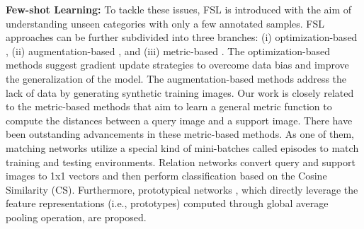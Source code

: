 \documentclass[10pt,twocolumn,letterpaper]{article}
\begin{document}
\textbf{Few-shot Learning:}
To tackle these issues, FSL is introduced with the aim of understanding unseen categories with only a few annotated samples. FSL approaches can be further subdivided into three branches: (i) optimization-based \cite{FSL2,optimization1,optimization2}, (ii) augmentation-based \cite{augmen1,augmen2}, and (iii) metric-based \cite{FSS17prototypical,metric1,metric-relation}. The optimization-based methods suggest gradient update strategies to overcome data bias and improve the generalization of the model. The augmentation-based methods address the lack of data by generating synthetic training images. Our work is closely related to the metric-based methods that aim to learn a general metric function to compute the distances between a query image and a support image. There have been outstanding advancements in these metric-based methods. As one of them, matching networks \cite{FSL3} utilize a special kind of mini-batches called episodes to match training and testing environments. Relation networks \cite{metric-relation} convert query and support images to 1x1 vectors and then perform classification based on the Cosine Similarity (CS). Furthermore, prototypical networks \cite{FSS17prototypical}, which directly leverage the feature representations (i.e., prototypes) computed through global average pooling operation, are proposed. 
\end{document}

